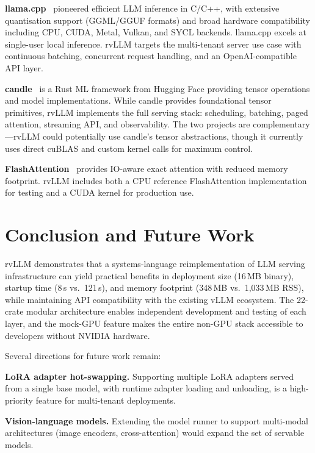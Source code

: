 \documentclass[11pt,a4paper]{article}
\begin{document}
\textbf{llama.cpp}~\cite{llamacpp2023} pioneered efficient LLM inference in C/C++,
with extensive quantisation support (GGML/GGUF formats) and broad hardware
compatibility including CPU, CUDA, Metal, Vulkan, and SYCL backends. llama.cpp excels
at single-user local inference. rvLLM targets the multi-tenant server use case with
continuous batching, concurrent request handling, and an OpenAI-compatible API layer.

\textbf{candle}~\cite{candle2023} is a Rust ML framework from Hugging Face providing
tensor operations and model implementations. While candle provides foundational tensor
primitives, rvLLM implements the full serving stack: scheduling, batching, paged
attention, streaming API, and observability. The two projects are complementary---rvLLM
could potentially use candle's tensor abstractions, though it currently uses direct
cuBLAS and custom kernel calls for maximum control.

\textbf{FlashAttention}~\cite{dao2022flashattention,dao2023flashattention2} provides
IO-aware exact attention with reduced memory footprint. rvLLM includes both a CPU
reference FlashAttention implementation for testing and a CUDA kernel for production
use.

\section{Conclusion and Future Work}
\label{sec:conclusion}

rvLLM demonstrates that a systems-language reimplementation of LLM serving
infrastructure can yield practical benefits in deployment size (16\,MB binary),
startup time (8\,s vs.\ 121\,s), and memory footprint (348\,MB vs.\ 1{,}033\,MB RSS),
while maintaining API compatibility with the existing vLLM ecosystem. The 22-crate modular architecture
enables independent development and testing of each layer, and the mock-GPU feature
makes the entire non-GPU stack accessible to developers without NVIDIA hardware.

Several directions for future work remain:

\textbf{LoRA adapter hot-swapping.} Supporting multiple LoRA adapters served from a
single base model, with runtime adapter loading and unloading, is a high-priority
feature for multi-tenant deployments.

\textbf{Vision-language models.} Extending the model runner to support multi-modal
architectures (image encoders, cross-attention) would expand the set of servable
models.
\end{document}
